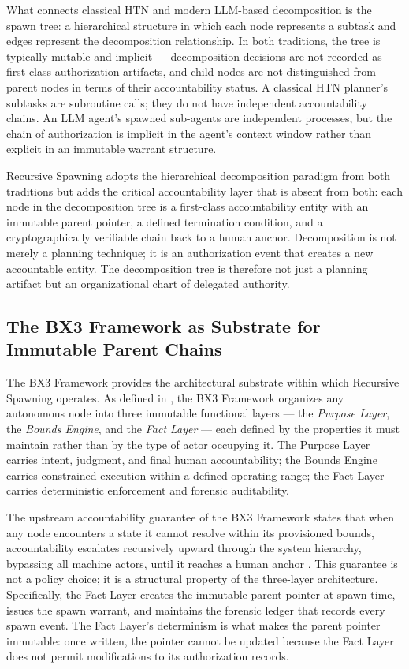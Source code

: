 What connects classical HTN and modern LLM-based decomposition is the spawn tree: a hierarchical structure in which each node represents a subtask and edges represent the decomposition relationship. In both traditions, the tree is typically mutable and implicit — decomposition decisions are not recorded as first-class authorization artifacts, and child nodes are not distinguished from parent nodes in terms of their accountability status. A classical HTN planner's subtasks are subroutine calls; they do not have independent accountability chains. An LLM agent's spawned sub-agents are independent processes, but the chain of authorization is implicit in the agent's context window rather than explicit in an immutable warrant structure.

Recursive Spawning adopts the hierarchical decomposition paradigm from both traditions but adds the critical accountability layer that is absent from both: each node in the decomposition tree is a first-class accountability entity with an immutable parent pointer, a defined termination condition, and a cryptographically verifiable chain back to a human anchor. Decomposition is not merely a planning technique; it is an authorization event that creates a new accountable entity. The decomposition tree is therefore not just a planning artifact but an organizational chart of delegated authority.

\subsection{The BX3 Framework as Substrate for Immutable Parent Chains}

The BX3 Framework provides the architectural substrate within which Recursive Spawning operates. As defined in \cite{bx3framework2026}, the BX3 Framework organizes any autonomous node into three immutable functional layers — the \textit{Purpose Layer}, the \textit{Bounds Engine}, and the \textit{Fact Layer} — each defined by the properties it must maintain rather than by the type of actor occupying it. The Purpose Layer carries intent, judgment, and final human accountability; the Bounds Engine carries constrained execution within a defined operating range; the Fact Layer carries deterministic enforcement and forensic auditability.

The upstream accountability guarantee of the BX3 Framework states that when any node encounters a state it cannot resolve within its provisioned bounds, accountability escalates recursively upward through the system hierarchy, bypassing all machine actors, until it reaches a human anchor \cite{bx3framework2026}. This guarantee is not a policy choice; it is a structural property of the three-layer architecture. Specifically, the Fact Layer creates the immutable parent pointer at spawn time, issues the spawn warrant, and maintains the forensic ledger that records every spawn event. The Fact Layer's determinism is what makes the parent pointer immutable: once written, the pointer cannot be updated because the Fact Layer does not permit modifications to its authorization records.

